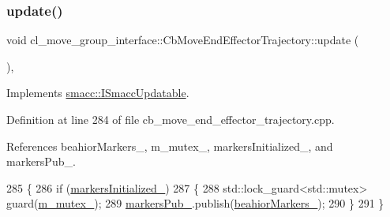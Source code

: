 \mbox{\label{classcl__move__group__interface_1_1CbMoveEndEffectorTrajectory_a57fedb6a0603fe569842a13faf19f5cd}} 
\subsubsection{\texorpdfstring{update()}{update()}}
{\footnotesize\ttfamily void cl\+\_\+move\+\_\+group\+\_\+interface\+::\+Cb\+Move\+End\+Effector\+Trajectory\+::update (\begin{DoxyParamCaption}{ }\end{DoxyParamCaption})\hspace{0.3cm}{\ttfamily [override]}, {\ttfamily [virtual]}}



Implements \hyperlink{classsmacc_1_1ISmaccUpdatable_a84ee0520cbefdb1d412bed54650b028e}{smacc\+::\+I\+Smacc\+Updatable}.



Definition at line 284 of file cb\+\_\+move\+\_\+end\+\_\+effector\+\_\+trajectory.\+cpp.



References beahior\+Markers\+\_\+, m\+\_\+mutex\+\_\+, markers\+Initialized\+\_\+, and markers\+Pub\+\_\+.


\begin{DoxyCode}
285     \{
286         \textcolor{keywordflow}{if} (\hyperlink{classcl__move__group__interface_1_1CbMoveEndEffectorTrajectory_ac140a7f0adfb20f1e2900a5c8cd2ca5b}{markersInitialized\_})
287         \{
288             std::lock\_guard<std::mutex> guard(\hyperlink{classcl__move__group__interface_1_1CbMoveEndEffectorTrajectory_a2a98ef725cb3fc7f61654d3d6a2066bb}{m\_mutex\_});
289             \hyperlink{classcl__move__group__interface_1_1CbMoveEndEffectorTrajectory_aabc2216b2d8625fecd83c5ec69928e63}{markersPub\_}.publish(\hyperlink{classcl__move__group__interface_1_1CbMoveEndEffectorTrajectory_a809fb5385adf27c0a1c8f8136566949c}{beahiorMarkers\_});
290         \}
291     \}
\end{DoxyCode}


